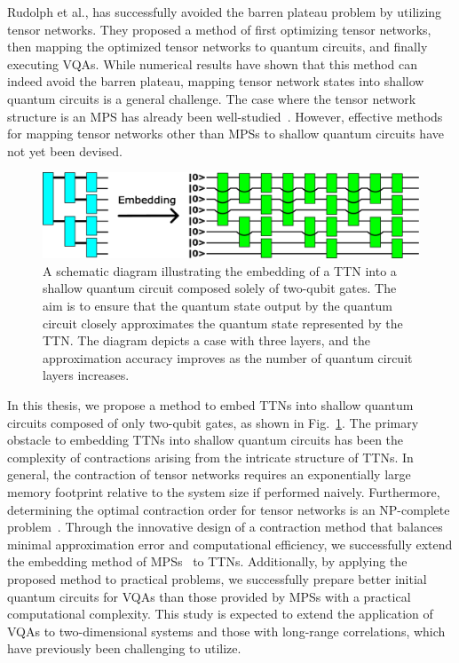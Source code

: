 \documentclass[12pt,dvipdfmx,twoside,openright]{report}
\begin{document}
Rudolph et al., has successfully avoided the barren plateau problem by utilizing tensor networks\cite{rudolph2023synergistic}.
They proposed a method of first optimizing tensor networks, then mapping the optimized tensor networks to quantum circuits, and finally executing VQAs.
While numerical results have shown that this method can indeed avoid the barren plateau, mapping tensor network states into shallow quantum circuits is a general challenge.
The case where the tensor network structure is an MPS has already been well-studied~\cite{EncodingMPS,mpsdecomp,mpsoptim,mpspreparation}.
However, effective methods for mapping tensor networks other than MPSs to shallow quantum circuits have not yet been devised.
\begin{figure}
    \centering
    \includegraphics[width=\linewidth]{fig-task-setting.pdf}
    \caption{A schematic diagram illustrating the embedding of a TTN into a shallow quantum circuit composed solely of two-qubit gates. The aim is to ensure that the quantum state output by the quantum circuit closely approximates the quantum state represented by the TTN. The diagram depicts a case with three layers, and the approximation accuracy improves as the number of quantum circuit layers increases.}
    \label{fig:task-setting}
\end{figure}

In this thesis, we propose a method to embed TTNs into shallow quantum circuits composed of only two-qubit gates, as shown in Fig.~\ref{fig:task-setting}.
The primary obstacle to embedding TTNs into shallow quantum circuits has been the complexity of contractions arising from the intricate structure of TTNs.
In general, the contraction of tensor networks requires an exponentially large memory footprint relative to the system size if performed naively.
Furthermore, determining the optimal contraction order for tensor networks is an NP-complete problem~\cite{np-complete}.
Through the innovative design of a contraction method that balances minimal approximation error and computational efficiency, we successfully extend the embedding method of MPSs~\cite{mpsdecomp} to TTNs.
Additionally, by applying the proposed method to practical problems, we successfully prepare better initial quantum circuits for VQAs than those provided by MPSs with a practical computational complexity.
This study is expected to extend the application of VQAs to two-dimensional systems and those with long-range correlations, which have previously been challenging to utilize.
\end{document}
